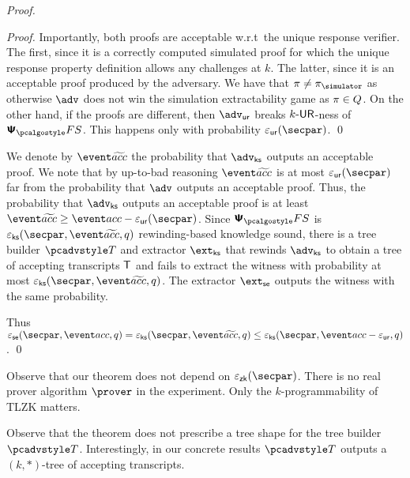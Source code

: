 \begin{proof}
\begin{proof}
	Importantly, both proofs are acceptable w.r.t~the unique response verifier. The first, since it is a correctly computed simulated proof for which the unique response property definition allows any challenges at $k$. The latter, since it is an acceptable proof produced by the adversary.
	We have that $\zkproof \neq \zkproofs$ as otherwise $\advse$ does not win the simulation extractability game as $\pi \in Q$. On the other hand, if the proofs are different, then $\advur$ breaks ${k\text{-}\mathsf{UR}}$-ness of $\psfs$. This happens only with  probability $\epsur(\secpar)$. 
	\qed
	\end{proof}

	We denote by $\waccProb$ the probability that $\advcss$ outputs an acceptable proof. We note that by up-to-bad reasoning $\waccProb$ is at most $\epsur (\secpar)$ far from the probability that $\advse$ outputs an acceptable proof. Thus, the probability that $\advcss$ outputs an acceptable proof is at least $\waccProb \geq \accProb - \epsur (\secpar)$. %
%
	Since $\psfs$ is $\epscss (\secpar, \waccProb,q)$ rewinding-based knowledge sound, there is a tree builder $\tdv$ and extractor $\extcss$ that rewinds $\advcss$ to obtain a tree of accepting transcripts $\mathsf{T}$ and fails to extract the witness with probability at most $\epscss (\secpar, \waccProb, q)$. The extractor $\extse$ outputs the witness with the same probability.

%
	Thus $\epsse(\secpar,\accProb,q) = \epscss (\secpar, \waccProb,q) \leq \epscss(\secpar,\accProb - \epsur,q)$.
	\qed
	\end{proof}

\begin{remark}
Observe that our theorem does not depend on $\epszk(\secpar)$. There is no real prover algorithm $\prover$ in the experiment. Only the $k$-programmability of TLZK matters. 
\end{remark}

\begin{remark}
Observe that the theorem does not prescribe a tree shape for the tree builder $\tdv$. Interestingly, in our concrete results $\tdv$ outputs a $(k, *)$-tree of accepting transcripts.
\end{remark}


